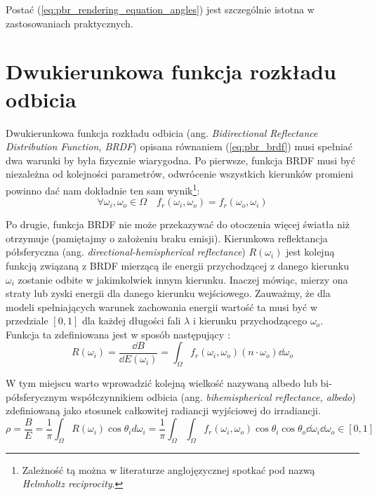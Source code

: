 \documentclass[../main.tex]{subfiles}
\begin{document}
\noindent Postać (\ref{eq:pbr_rendering_equation_angles}) jest szczególnie istotna w zastosowaniach praktycznych.

\section{Dwukierunkowa funkcja rozkładu odbicia}

Dwukierunkowa funkcja rozkładu odbicia (ang. \textit{Bidirectional Reflectance Distribution Function, BRDF}) opisana równaniem (\ref{eq:pbr_brdf}) musi spełniać dwa warunki by była fizycznie wiarygodna. Po pierwsze, funkcja BRDF musi być niezależna od kolejności parametrów, odwrócenie wszystkich kierunków promieni powinno dać nam dokładnie ten sam wynik\footnote{Zależność tą można w literaturze anglojęzycznej spotkać pod nazwą \textit{Helmholtz reciprocity}.}:
\begin{equation}
\forall{\omega_i, \omega_o \in \Omega} \quad
  f_r(\omega_i, \omega_o) = f_r(\omega_o, \omega_i)
\end{equation}

Po drugie, funkcja BRDF nie może przekazywać do otoczenia więcej światła niż otrzymuje (pamiętajmy o założeniu braku emisji). Kierunkowa reflektancja półsferyczna (ang. \textit{directional-hemispherical reflectance}) $R(\omega_i)$ jest kolejną funkcją związaną z BRDF mierzącą ile energii przychodzącej z danego kierunku $\omega_i$ zostanie odbite w jakimkolwiek innym kierunku. Inaczej mówiąc, mierzy ona straty lub zyski energii dla danego kierunku wejściowego. Zauważmy, że dla modeli spełniających warunek zachowania energii wartość ta musi być w przedziale $\left[0,1\right]$ dla każdej długości fali $\lambda$ i kierunku przychodzącego $\omega_o$. Funkcja ta zdefiniowana jest w sposób następujący \cite{RealTimeRendering2008}:
\begin{equation}
  R(\omega_i) 
  = \frac{\dd B}{\dd E(\omega_i)} 
  = \int_{\Omega} {
    f_r(\omega_i, \omega_o)
    (n \cdot \omega_o)
    \dd \omega_o
  }
\end{equation}

W tym miejscu warto wprowadzić kolejną wielkość nazywaną albedo lub bi-półsferycznym współczynnikiem odbicia (ang. \textit{bihemispherical reflectance, albedo}) zdefiniowaną jako stosunek całkowitej radiancji wyjściowej do irradiancji.
\begin{equation}
    \rho = \frac{B}{E} = \frac{1}{\pi} \int_{\Omega}{
        R(\omega_i) \cos\theta_i d\omega_i
    }
    = \frac{1}{\pi} \int_{\Omega} \int_{\Omega} {
        f_r(\omega_i, \omega_o) 
        \cos\theta_i 
        \cos\theta_o 
        \dd\omega_i 
        \dd\omega_o
    }
    \in \left[0, 1\right]
\end{equation}
\end{document}
